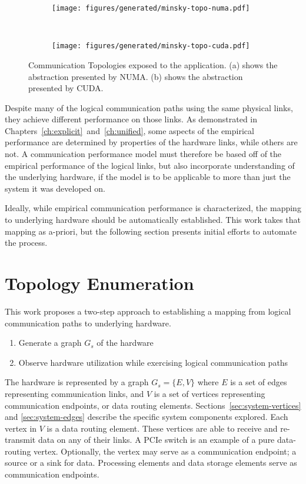 \begin{figure}[ht]
    \centering
    \begin{subfigure}[b]{0.45\textwidth}
        \texttt{[image: figures/generated/minsky-topo-numa.pdf]}
        \caption{}
        \label{fig:minsky-topo-numa}
    \end{subfigure}
    ~
    \begin{subfigure}[b]{0.45\textwidth}
        \texttt{[image: figures/generated/minsky-topo-cuda.pdf]}
        \caption{}
        \label{fig:minsky-topo-cuda}
    \end{subfigure}
    \caption[Communication Topologies Exposed to Application]{
        Communication Topologies exposed to the application.
        (a) shows the abstraction presented by NUMA.
        (b) shows the abstraction presented by CUDA.
    }
    \label{fig:minsky-abstraction}
\end{figure}

Despite many of the logical communication paths using the same physical links, they achieve different performance on those links.
As demonstrated in Chapters~\ref{ch:explicit}~and~\ref{ch:unified}, some aspects of the empirical performance are determined by properties of the hardware links, while others are not.
A communication performance model must therefore be based off of the empirical performance of the logical links, but also incorporate understanding of the underlying hardware, if the model is to be applicable to more than just the system it was developed on.

Ideally, while empirical communication performance is characterized, the mapping to underlying hardware should be automatically established.
This work takes that mapping as a-priori, but the following section presents initial efforts to automate the process.

\section{Topology Enumeration}
\label{sec:hardware-enumeration}

This work proposes a two-step approach to establishing a mapping from logical communication paths to underlying hardware.
\begin{enumerate}
    \item Generate a graph $G_s$ of the hardware
    \item Observe hardware utilization while exercising logical communication paths
\end{enumerate}
The hardware is represented by a graph $G_s = \{E,V\}$ where $E$ is a set of edges representing communication links, and $V$ is a set of vertices representing communication endpoints, or data routing elements.
Sections~\ref{sec:system-vertices} and \ref{sec:system-edges} describe the specific system components explored.
Each vertex in $V$ is a data routing element.
These vertices are able to receive and re-transmit data on any of their links.
A PCIe switch is an example of a pure data-routing vertex.
Optionally, the vertex may serve as a communication endpoint; a source or a sink for data.
Processing elements and data storage elements serve as communication endpoints.

